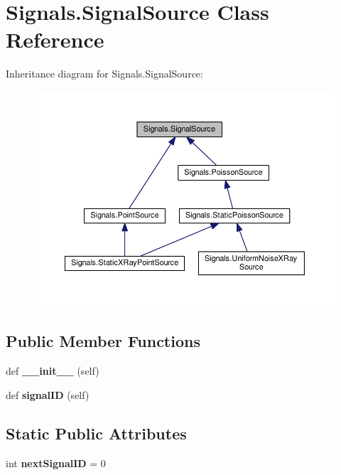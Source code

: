 \hypertarget{classSignals_1_1SignalSource}{}\section{Signals.\+Signal\+Source Class Reference}
\label{classSignals_1_1SignalSource}


Inheritance diagram for Signals.\+Signal\+Source\+:\nopagebreak
\begin{figure}[H]
\begin{center}
\leavevmode
\includegraphics[width=350pt]{classSignals_1_1SignalSource__inherit__graph}
\end{center}
\end{figure}
\subsection*{Public Member Functions}
\begin{DoxyCompactItemize}
\item 
def {\bfseries \+\_\+\+\_\+init\+\_\+\+\_\+} (self)\hypertarget{classSignals_1_1SignalSource_a18e58f799786c10300d066e9e0de7236}{}\label{classSignals_1_1SignalSource_a18e58f799786c10300d066e9e0de7236}

\item 
def {\bfseries signal\+ID} (self)\hypertarget{classSignals_1_1SignalSource_a85016cca8a7f1e188d314ced50577d05}{}\label{classSignals_1_1SignalSource_a85016cca8a7f1e188d314ced50577d05}

\end{DoxyCompactItemize}
\subsection*{Static Public Attributes}
\begin{DoxyCompactItemize}
\item 
int {\bfseries next\+Signal\+ID} = 0\hypertarget{classSignals_1_1SignalSource_abcff0d069f17cb5ebe3eff15b6283a64}{}\label{classSignals_1_1SignalSource_abcff0d069f17cb5ebe3eff15b6283a64}

\end{DoxyCompactItemize}


